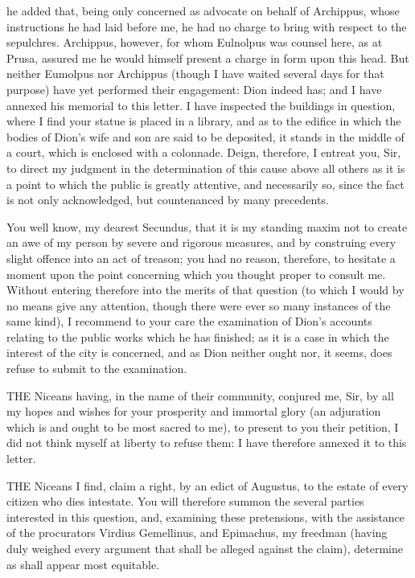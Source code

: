 he added that, being only concerned as advocate on behalf of Archippus,
whose instructions he had laid before me, he had no charge to bring with
respect to the sepulchres. Archippus, however, for whom Eulnolpus was
counsel here, as at Prusa, assured me he would himself present a charge in
form upon this head. But neither Eumolpus nor Archippus (though I have
waited several days for that purpose) have yet performed their engagement:
Dion indeed has; and I have annexed his memorial to this letter. I have
inspected the buildings in question, where I find your statue is placed in
a library, and as to the edifice in which the bodies of Dion's wife and
son are said to be deposited, it stands in the middle of a court, which is
enclosed with a colonnade. Deign, therefore, I entreat you, Sir, to direct
my judgment in the determination of this cause above all others as it is a
point to which the public is greatly attentive, and necessarily so, since
the fact is not only acknowledged, but countenanced by many precedents.


You well know, my dearest Secundus, that it is my standing maxim not to
create an awe of my person by severe and rigorous measures, and by
construing every slight offence into an act of treason; you had no reason,
therefore, to hesitate a moment upon the point concerning which you
thought proper to consult me. Without entering therefore into the merits
of that question (to which I would by no means give any attention, though
there were ever so many instances of the same kind), I recommend to your
care the examination of Dion's accounts relating to the public works which
he has finished; as it is a case in which the interest of the city is
concerned, and as Dion neither ought nor, it seems, does refuse to submit
to the examination.


THE Niceans having, in the name of their community, conjured me, Sir, by
all my hopes and wishes for your prosperity and immortal glory (an
adjuration which is and ought to be most sacred to me), to present to you
their petition, I did not think myself at liberty to refuse them: I have
therefore annexed it to this letter.


THE Niceans I find, claim a right, by an edict of Augustus, to the estate
of every citizen who dies intestate. You will therefore summon the several
parties interested in this question, and, examining these pretensions,
with the assistance of the procurators Virdius Gemellinus, and Epimachus,
my freedman (having duly weighed every argument that shall be alleged
against the claim), determine as shall appear most equitable.

